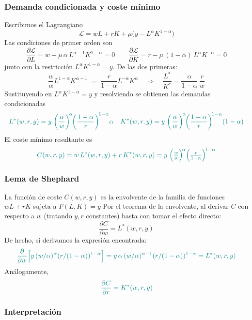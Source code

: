 \documentclass{article}
\begin{document}
\subsubsection*{Demanda condicionada y coste mínimo}

Escribimos el Lagrangiano
\[
\mathcal L = wL + rK + \mu\bigl(y - L^\alpha K^{1-\alpha}\bigr)
\]
Las condiciones de primer orden son
\[
\frac{\partial\mathcal L}{\partial L}
= w - \mu\,\alpha\,L^{\alpha-1}K^{1-\alpha} = 0
\qquad
\frac{\partial\mathcal L}{\partial K}
= r - \mu\,(1-\alpha)\,L^\alpha K^{-\alpha} = 0
\]
junto con la restricción \(L^\alpha K^{1-\alpha}=y\). De las dos primeras:
\[
\frac{w}{\alpha}L^{1-\alpha}K^{\alpha-1}
\;=\;
\frac{r}{1-\alpha}L^{-\alpha}K^\alpha
\quad\Longrightarrow\quad
\frac{L^*}{K^*} = \frac{\alpha}{1-\alpha}\,\frac{r}{w}
\]
Sustituyendo en \(L^{\alpha}K^{1-\alpha}=y\) y resolviendo se obtienen las demandas condicionadas
\[\color{teal}
L^*(w,r,y)
= y\;\biggl(\frac{\alpha}{w}\biggr)^{\!\alpha}\!\biggl(\frac{1-\alpha}{r}\biggr)^{\!1-\alpha}\alpha
\quad
K^*(w,r,y)
= y\;\biggl(\frac{\alpha}{w}\biggr)^{\!\alpha}\!\biggl(\frac{1-\alpha}{r}\biggr)^{\!1-\alpha}(1-\alpha)
\]
El coste mínimo resultante es
\[\color{teal}
C(w,r,y)
= w\,L^*(w,r,y) + r\,K^*(w,r,y)
= y\;\Bigl(\tfrac{w}{\alpha}\Bigr)^{\!\alpha}
        \Bigl(\tfrac{r}{1-\alpha}\Bigr)^{\!1-\alpha}
\]

\subsubsection*{Lema de Shephard}

La función de coste \(C(w,r,y)\) es la envolvente de la familia de funciones \(wL + rK\) sujeta a \(F(L,K)=y\)  
Por el teorema de la envolvente, al derivar \(C\) con respecto a \(w\) (tratando \(y,r\) constantes) basta con tomar el efecto directo:
\[
\frac{\partial C}{\partial w}
= L^*(w,r,y)
\]
De hecho, si derivamos la expresión encontrada:
\[\color{teal}
\frac{\partial}{\partial w}
\Bigl[y\,(w/\alpha)^\alpha(r/(1-\alpha))^{1-\alpha}\Bigr]
= y\,\alpha\,(w/\alpha)^{\alpha-1}(r/(1-\alpha))^{1-\alpha}
= L^*(w,r,y)
\]
Análogamente,
\[\color{teal}
\frac{\partial C}{\partial r}
= K^*(w,r,y)
\]

\subsubsection*{Interpretación}
\end{document}
